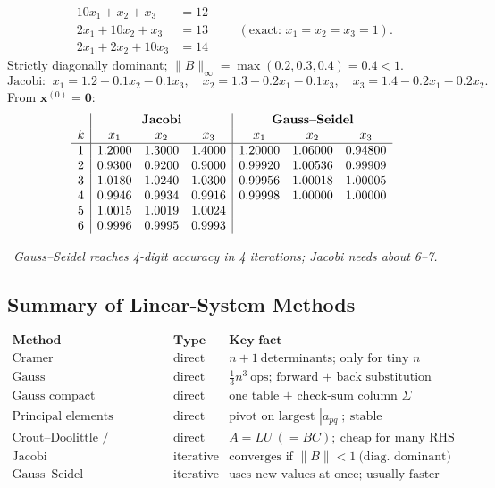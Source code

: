 \documentclass[hidelinks]{article}
\newcommand{\callout}[1]{\par\smallskip\noindent{\color{capri}$\blacktriangleright$}\ \textit{#1}\par\smallskip}
\newcommand{\abs}[1]{\left|#1\right|}
\begin{document}
\[
\begin{aligned}
10x_1+x_2+x_3&=12\\
2x_1+10x_2+x_3&=13\\
2x_1+2x_2+10x_3&=14
\end{aligned}
\qquad(\text{exact: }x_1=x_2=x_3=1).
\]
Strictly diagonally dominant; $\|B\|_\infty=\max(0.2,0.3,0.4)=0.4<1$.
\[
\text{Jacobi: }\ x_1=1.2-0.1x_2-0.1x_3,\quad x_2=1.3-0.2x_1-0.1x_3,\quad x_3=1.4-0.2x_1-0.2x_2 .
\]
From $\mathbf x^{(0)}=\mathbf0$:
\[
\begin{array}{c|ccc|ccc}
 & \multicolumn{3}{c|}{\textbf{Jacobi}} & \multicolumn{3}{c}{\textbf{Gauss--Seidel}}\\
k & x_1 & x_2 & x_3 & x_1 & x_2 & x_3\\ \hline
1 & 1.2000 & 1.3000 & 1.4000 & 1.20000 & 1.06000 & 0.94800\\
2 & 0.9300 & 0.9200 & 0.9000 & 0.99920 & 1.00536 & 0.99909\\
3 & 1.0180 & 1.0240 & 1.0300 & 0.99956 & 1.00018 & 1.00005\\
4 & 0.9946 & 0.9934 & 0.9916 & 0.99998 & 1.00000 & 1.00000\\
5 & 1.0015 & 1.0019 & 1.0024 & & & \\
6 & 0.9996 & 0.9995 & 0.9993 & & & \\
\end{array}
\]
\callout{Gauss--Seidel reaches 4-digit accuracy in 4 iterations; Jacobi needs about 6--7.}

\subsection{Summary of Linear-System Methods}

\[
\begin{array}{lll}
\textbf{Method} & \textbf{Type} & \textbf{Key fact}\\ \hline
\text{Cramer} & \text{direct} & n+1\ \text{determinants; only for tiny }n\\
\text{Gauss} & \text{direct} & \tfrac13n^3\ \text{ops; forward + back substitution}\\
\text{Gauss compact} & \text{direct} & \text{one table + check-sum column }\Sigma\\
\text{Principal elements} & \text{direct} & \text{pivot on largest }\abs{a_{pq}};\ \text{stable}\\
\text{Crout--Doolittle / Khaletsky} & \text{direct} & A=LU\ (=BC);\ \text{cheap for many RHS}\\
\text{Jacobi} & \text{iterative} & \text{converges if }\|B\|<1\ \text{(diag.\ dominant)}\\
\text{Gauss--Seidel} & \text{iterative} & \text{uses new values at once; usually faster}\\
\end{array}
\]
\end{document}
